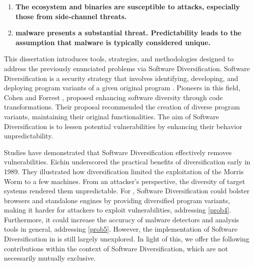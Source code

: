 \begin{enumerate}[label=\textbf{P\arabic*}, ref=\textbf{P\arabic*}]

	\item \label{prob4} \textbf{The \Wasm ecosystem and binaries are susceptible to attacks, especially those from side-channel threats.}
	
	\item \label{prob5} \textbf{\Wasm malware presents a substantial threat.
	Predictability leads to the assumption that malware is typically considered unique.}

\end{enumerate}


\begin{comment}
\msection{Problem statement}

\end{comment}


This dissertation introduces tools, strategies, and methodologies designed to address the previously enunciated problems via Software Diversification.
Software Diversification is a security strategy that involves identifying, developing, and deploying program variants of a given original program \cite{okhravi2013survey}.
Pioneers in this field, Cohen \etal \cite{cohen1993operating} and Forrest \etal \cite{595185}, proposed enhancing software diversity through code transformations. 
Their proposal recommended the creation of diverse program variants, maintaining their original functionalities. 
The aim of Software Diversification is to lessen potential vulnerabilities by enhancing their behavior unpredictability.




Studies have demonstrated that Software Diversification effectively removes vulnerabilities. 
Eichin \etal underscored the practical benefits of diversification \cite{36307} early in 1989. 
They illustrated how diversification limited the exploitation of the Morris Worm to a few machines. 
From an attacker's perspective, the diversity of target systems rendered them unpredictable.
For \Wasm, Software Diversification could bolster browsers and standalone engines by providing diversified program variants, making it harder for attackers to exploit vulnerabilities, addressing \ref{prob4}. 
Furthermore, it could increase the accuracy of \Wasm malware detectors and \Wasm analysis tools in general, addressing \ref{prob5}. 
However, the implementation of Software Diversification in \Wasm is still largely unexplored. 
In light of this, we offer the following contributions within the context of Software Diversification, which are not necessarily mutually exclusive.


